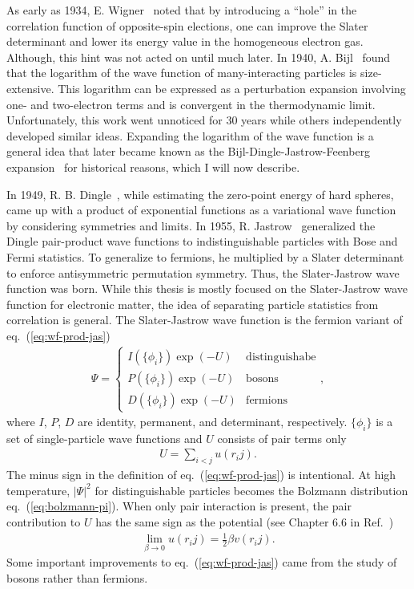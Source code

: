 As early as 1934, E. Wigner~\cite{Wigner1934} noted that by introducing a “hole” in the correlation function of opposite-spin elections, one can improve the Slater determinant and lower its energy value in the homogeneous electron gas. Although, this hint was not acted on until much later.
In 1940, A. Bijl~\cite{Bijl1940} found that the logarithm of the wave function of many-interacting particles is size-extensive. This logarithm can be expressed as a perturbation expansion involving one- and two-electron terms and is convergent in the thermodynamic limit.
Unfortunately, this work went unnoticed for 30 years while others independently developed similar ideas. Expanding the logarithm of the wave function is a general idea that later became known as the Bijl-Dingle-Jastrow-Feenberg expansion~\cite{Carleo2017} for historical reasons, which I will now describe.

In 1949, R. B. Dingle~\cite{Dingle1949}, while estimating the zero-point energy of hard spheres, came up with a product of exponential functions as a variational wave function by considering symmetries and limits. In 1955, R. Jastrow~\cite{Jastrow1955} generalized the Dingle pair-product wave functions to indistinguishable particles with Bose and Fermi statistics. To generalize to fermions, he multiplied by a Slater determinant to enforce antisymmetric permutation symmetry. Thus, the Slater-Jastrow wave function was born. While this thesis is mostly focused on the Slater-Jastrow wave function for electronic matter, the idea of separating particle statistics from correlation is general. The Slater-Jastrow wave function is the fermion variant of eq.~(\ref{eq:wf-prod-jas})
\begin{align} \label{eq:wf-prod-jas}
\Psi = \left\{\begin{array}{ll}
I(\{\phi_i\}) \exp(-U) & \text{distinguishabe} \\
P(\{\phi_i\}) \exp(-U) & \text{bosons} \\
D(\{\phi_i\}) \exp(-U) & \text{fermions}
\end{array}\right.,
\end{align}
where $I$, $P$, $D$ are identity, permanent, and determinant, respectively.
$\{\phi_i\}$ is a set of single-particle wave functions and $U$ consists of pair terms only
\begin{align} \label{eq:wf-pair-jas}
U = \sum\limits_{i<j} u(r_ij).
\end{align}
The minus sign in the definition of eq.~(\ref{eq:wf-prod-jas}) is intentional.
At high temperature, $\vert\Psi\vert^2$ for distinguishable particles becomes the Bolzmann distribution eq.~(\ref{eq:bolzmann-pi}). When only pair interaction is present, the pair contribution to $U$ has the same sign as the potential (see Chapter 6.6 in Ref.~\cite{Martin2016})
\begin{align}
\lim\limits_{\beta\rightarrow 0} u(r_ij) = \frac{1}{2}\beta v(r_ij).
\end{align}
Some important improvements to eq.~(\ref{eq:wf-prod-jas}) came from the study of bosons rather than fermions.

